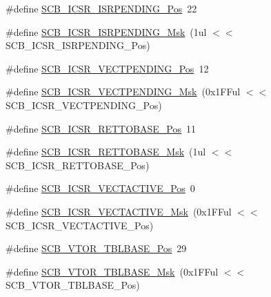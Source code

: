 \begin{DoxyCompactItemize}
\#define \mbox{\hyperlink{group___c_m_s_i_s___c_m3___s_c_b_ga10749d92b9b744094b845c2eb46d4319}{S\+C\+B\+\_\+\+I\+C\+S\+R\+\_\+\+I\+S\+R\+P\+E\+N\+D\+I\+N\+G\+\_\+\+Pos}}~22
\item 
\#define \mbox{\hyperlink{group___c_m_s_i_s___c_m3___s_c_b_ga056d74fd538e5d36d3be1f28d399c877}{S\+C\+B\+\_\+\+I\+C\+S\+R\+\_\+\+I\+S\+R\+P\+E\+N\+D\+I\+N\+G\+\_\+\+Msk}}~(1ul $<$$<$ S\+C\+B\+\_\+\+I\+C\+S\+R\+\_\+\+I\+S\+R\+P\+E\+N\+D\+I\+N\+G\+\_\+\+Pos)
\item 
\#define \mbox{\hyperlink{group___c_m_s_i_s___c_m3___s_c_b_gada60c92bf88d6fd21a8f49efa4a127b8}{S\+C\+B\+\_\+\+I\+C\+S\+R\+\_\+\+V\+E\+C\+T\+P\+E\+N\+D\+I\+N\+G\+\_\+\+Pos}}~12
\item 
\#define \mbox{\hyperlink{group___c_m_s_i_s___c_m3___s_c_b_gacb6992e7c7ddc27a370f62878a21ef72}{S\+C\+B\+\_\+\+I\+C\+S\+R\+\_\+\+V\+E\+C\+T\+P\+E\+N\+D\+I\+N\+G\+\_\+\+Msk}}~(0x1\+F\+Ful $<$$<$ S\+C\+B\+\_\+\+I\+C\+S\+R\+\_\+\+V\+E\+C\+T\+P\+E\+N\+D\+I\+N\+G\+\_\+\+Pos)
\item 
\#define \mbox{\hyperlink{group___c_m_s_i_s___c_m3___s_c_b_ga403d154200242629e6d2764bfc12a7ec}{S\+C\+B\+\_\+\+I\+C\+S\+R\+\_\+\+R\+E\+T\+T\+O\+B\+A\+S\+E\+\_\+\+Pos}}~11
\item 
\#define \mbox{\hyperlink{group___c_m_s_i_s___c_m3___s_c_b_gaca6fc3f79bb550f64fd7df782ed4a5f6}{S\+C\+B\+\_\+\+I\+C\+S\+R\+\_\+\+R\+E\+T\+T\+O\+B\+A\+S\+E\+\_\+\+Msk}}~(1ul $<$$<$ S\+C\+B\+\_\+\+I\+C\+S\+R\+\_\+\+R\+E\+T\+T\+O\+B\+A\+S\+E\+\_\+\+Pos)
\item 
\#define \mbox{\hyperlink{group___c_m_s_i_s___c_m3___s_c_b_gae4f602c7c5c895d5fb687b71b0979fc3}{S\+C\+B\+\_\+\+I\+C\+S\+R\+\_\+\+V\+E\+C\+T\+A\+C\+T\+I\+V\+E\+\_\+\+Pos}}~0
\item 
\#define \mbox{\hyperlink{group___c_m_s_i_s___c_m3___s_c_b_ga5533791a4ecf1b9301c883047b3e8396}{S\+C\+B\+\_\+\+I\+C\+S\+R\+\_\+\+V\+E\+C\+T\+A\+C\+T\+I\+V\+E\+\_\+\+Msk}}~(0x1\+F\+Ful $<$$<$ S\+C\+B\+\_\+\+I\+C\+S\+R\+\_\+\+V\+E\+C\+T\+A\+C\+T\+I\+V\+E\+\_\+\+Pos)
\item 
\#define \mbox{\hyperlink{group___c_m_s_i_s___c_m3___s_c_b_gad9720a44320c053883d03b883b955751}{S\+C\+B\+\_\+\+V\+T\+O\+R\+\_\+\+T\+B\+L\+B\+A\+S\+E\+\_\+\+Pos}}~29
\item 
\#define \mbox{\hyperlink{group___c_m_s_i_s___c_m3___s_c_b_ga778dd0ba178466b2a8877a6b8aa345ee}{S\+C\+B\+\_\+\+V\+T\+O\+R\+\_\+\+T\+B\+L\+B\+A\+S\+E\+\_\+\+Msk}}~(0x1\+F\+Ful $<$$<$ S\+C\+B\+\_\+\+V\+T\+O\+R\+\_\+\+T\+B\+L\+B\+A\+S\+E\+\_\+\+Pos)
\item 
$$
\end{DoxyCompactItemize}
